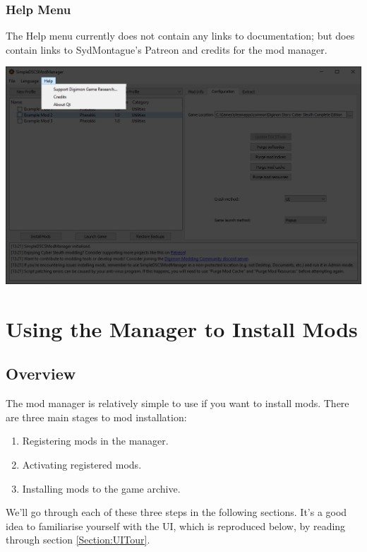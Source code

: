 \documentclass{article}
\begin{document}
\subsubsection{Help Menu}
The Help menu currently does not contain any links to documentation; but does contain links to SydMontague's Patreon and credits for the mod manager.
\begin{center}
  \includegraphics[scale=0.4]{img/modmanager_ui_help.jpg}
\end{center}
\newpage


\section{Using the Manager to Install Mods}
\subsection{Overview}
The mod manager is relatively simple to use if you want to install mods. There are three main stages to mod installation:
\begin{enumerate}
\item Registering mods in the manager.
\item Activating registered mods.
\item Installing mods to the game archive.
\end{enumerate}
We'll go through each of these three steps in the following sections. It's a good idea to familiarise yourself with the UI, which is reproduced below, by reading through section \ref{Section:UITour}.
\end{document}
